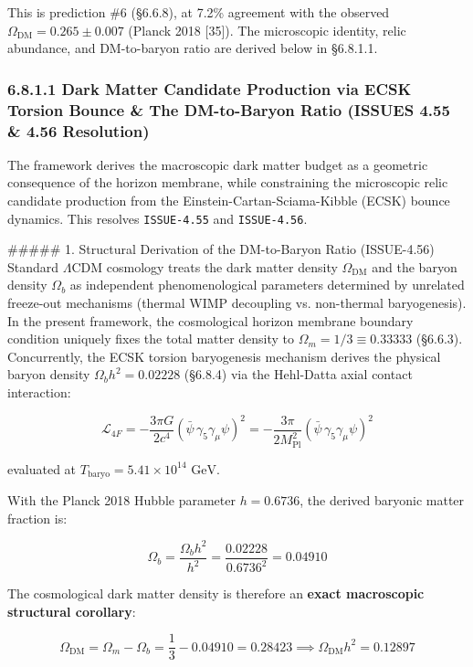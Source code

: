 \documentclass[11pt,a4paper]{article}
\theoremstyle{definition}
\theoremstyle{remark}
\begin{document}
This is prediction \#6 (\S 6.6.8), at 7.2\% agreement with the observed $\Omega_{\text{DM}} = 0.265 \pm 0.007$ (Planck 2018 [35]). The microscopic identity, relic abundance, and DM-to-baryon ratio are derived below in \S 6.8.1.1.

\subsubsection{6.8.1.1 Dark Matter Candidate Production via ECSK Torsion Bounce \& The DM-to-Baryon Ratio (ISSUES 4.55 \& 4.56 Resolution)}

The framework derives the macroscopic dark matter budget as a geometric consequence of the horizon membrane, while constraining the microscopic relic candidate production from the Einstein-Cartan-Sciama-Kibble (ECSK) bounce dynamics. This resolves \texttt{ISSUE-4.55} and \texttt{ISSUE-4.56}.

\#\#\#\#\# 1. Structural Derivation of the DM-to-Baryon Ratio (ISSUE-4.56)
Standard $\Lambda\text{CDM}$ cosmology treats the dark matter density $\Omega_{\text{DM}}$ and the baryon density $\Omega_b$ as independent phenomenological parameters determined by unrelated freeze-out mechanisms (thermal WIMP decoupling vs. non-thermal baryogenesis). In the present framework, the cosmological horizon membrane boundary condition uniquely fixes the total matter density to $\Omega_m = 1/3 \equiv 0.33333$ (\S 6.6.3). Concurrently, the ECSK torsion baryogenesis mechanism derives the physical baryon density $\Omega_b h^2 = 0.02228$ (\S 6.8.4) via the Hehl-Datta axial contact interaction:


\begin{equation}
\mathcal{L}_{4F} = -\frac{3\pi G}{2c^4} (\bar{\psi} \, \gamma_5\gamma_\mu\psi)^2 = -\frac{3\pi}{2 M_{\text{Pl}}^2} (\bar{\psi} \, \gamma_5\gamma_\mu\psi)^2
\end{equation}


evaluated at $T_{\text{baryo}} = 5.41 \times 10^{14}\text{ GeV}$.

With the Planck 2018 Hubble parameter $h = 0.6736$, the derived baryonic matter fraction is:


\begin{equation}
\Omega_b = \frac{\Omega_b h^2}{h^2} = \frac{0.02228}{0.6736^2} = 0.04910
\end{equation}


The cosmological dark matter density is therefore an \textbf{exact macroscopic structural corollary}:


\begin{equation}
\Omega_{\text{DM}} = \Omega_m - \Omega_b = \frac{1}{3} - 0.04910 = 0.28423 \implies \Omega_{\text{DM}} h^2 = 0.12897
\end{equation}
\end{document}
